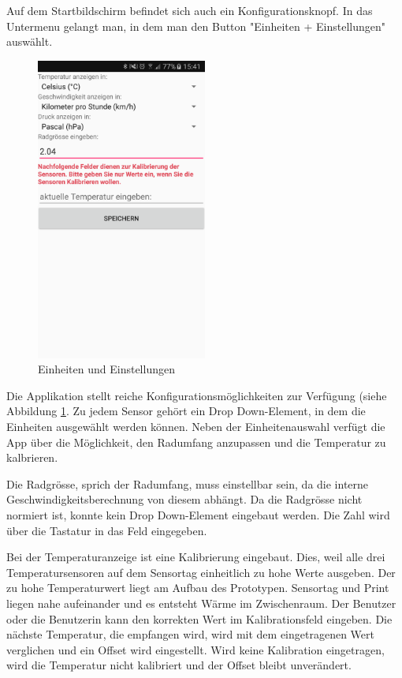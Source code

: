 Auf dem Startbildschirm befindet sich auch ein Konfigurationsknopf. In das Untermenu gelangt man, in dem man den Button "Einheiten + Einstellungen" auswählt.

\begin{figure}[ht]
    \includegraphics[width=0.5\textwidth]{4Resultate/imag/BLEEinheitenUndEinstellungenStart.png} 
    \caption{Einheiten und Einstellungen}
    \label{einheiten}
\end{figure}

Die Applikation stellt reiche Konfigurationsmöglichkeiten zur Verfügung (siehe Abbildung \ref{einheiten}. Zu jedem Sensor gehört ein Drop Down-Element, in dem die Einheiten ausgewählt werden können. Neben der Einheitenauswahl verfügt die App über die Möglichkeit, den Radumfang anzupassen und die Temperatur zu kalbrieren. 

Die Radgrösse, sprich der Radumfang, muss einstellbar sein, da die interne Geschwindigkeitsberechnung von diesem abhängt. Da die Radgrösse nicht normiert ist, konnte kein Drop Down-Element eingebaut werden. Die Zahl wird über die Tastatur in das Feld eingegeben.

Bei der Temperaturanzeige ist eine Kalibrierung eingebaut. Dies, weil alle drei Temperatursensoren auf dem Sensortag einheitlich zu hohe Werte ausgeben. Der zu hohe Temperaturwert liegt am Aufbau des Prototypen. Sensortag und Print liegen nahe aufeinander und es entsteht Wärme im Zwischenraum. Der Benutzer oder die Benutzerin kann den korrekten Wert im Kalibrationsfeld eingeben. Die nächste Temperatur, die empfangen wird, wird mit dem eingetragenen Wert verglichen und ein Offset wird eingestellt. Wird keine Kalibration eingetragen, wird die Temperatur nicht kalibriert und der Offset bleibt unverändert.

